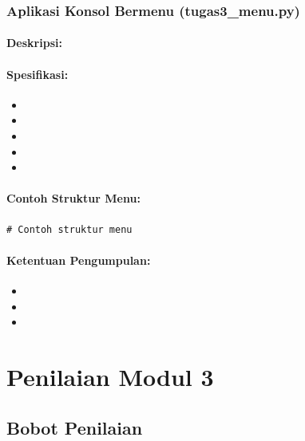 \documentclass[12pt,a4paper]{article}
\begin{document}
\subsubsection{Aplikasi Konsol Bermenu (tugas3\_menu.py)}

\paragraph{Deskripsi:}

\paragraph{Spesifikasi:}
\begin{itemize}
    \item 
    \item 
    \item 
    \item 
    \item 
\end{itemize}

\paragraph{Contoh Struktur Menu:}

\begin{lstlisting}
# Contoh struktur menu
\end{lstlisting}

\paragraph{Ketentuan Pengumpulan:}
\begin{itemize}
    \item 
    \item 
    \item 
\end{itemize}

\section{Penilaian Modul 3}

\subsection{Bobot Penilaian}
\end{document}
